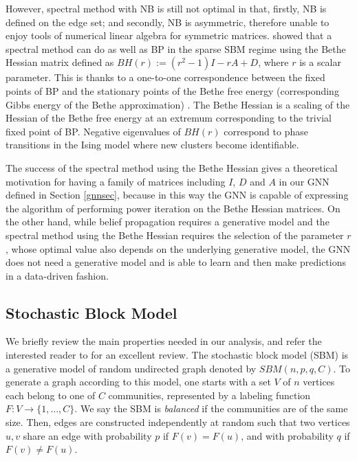 \documentclass{article} \usepackage{iclr2019_conference,times}
\begin{document}
However, spectral method with NB is still not optimal in that, firstly, NB is defined on the edge set; and secondly, NB is asymmetric, therefore unable to enjoy tools of numerical linear algebra for symmetric matrices. \cite{saade2014spectral} showed that a spectral method can do as well as BP in the sparse SBM regime using the Bethe Hessian matrix defined as $ BH(r):= (r^2-1) I - rA+D$, where $r$ is a scalar parameter.  This is thanks to a one-to-one correspondence between the fixed points of BP and the stationary points of the Bethe free energy (corresponding Gibbs energy of the Bethe approximation) \citep{saade2014spectral}. The Bethe Hessian is a scaling of the Hessian of the Bethe free energy at an extremum corresponding to the trivial fixed point of BP. Negative eigenvalues of $BH(r)$ correspond to phase transitions in the Ising model where new clusters become identifiable. 

The success of the spectral method using the Bethe Hessian gives a theoretical motivation for having a family of matrices including $I$, $D$ and $A$ in our GNN defined in Section \ref{gnnsec}, because in this way the GNN is capable of expressing the algorithm of performing power iteration on the Bethe Hessian matrices. 
On the other hand, while belief propagation requires a generative model and the spectral method using the Bethe Hessian requires the selection of the parameter $r$, whose optimal value also depends on the underlying generative model, the  GNN does not need a generative model and is able to learn and then make predictions in a data-driven fashion.


\subsection{Stochastic Block Model}
\label{sbmsec}
We briefly review the main properties needed in our analysis, and refer the interested reader to \cite{abbe2017community} for an excellent review.
The stochastic block model (SBM) is a generative model of random undirected graph denoted by $SBM(n,p,q, C)$. To generate a graph according to this model, one starts with a set $V$ of $n$ vertices each belong to one of $C$ communities, represented by a labeling function $F: V \rightarrow \{1, \dots, C\}$. We say the SBM is \textit{balanced} if the communities are of the same size.
Then, edges are constructed independently at random such that two vertices $u, v$ share an edge with probability $p$ if $F(v) = F(u)$, and with probability $q$ if $F(v) \neq F(u)$. 
\end{document}
